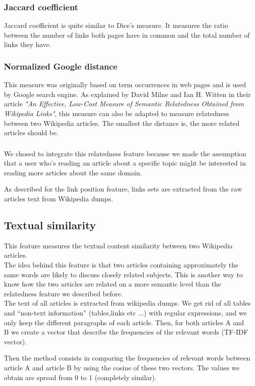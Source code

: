 \subsubsection*{Jaccard coefficient}
Jaccard coefficient is quite similar to Dice's measure. It measures the ratio between the number of links both pages have in common and the total number of links they have.\

\subsubsection*{Normalized Google distance}
This measure was originally based on term occurrences in web pages and is used by Google search engine. As explained by David Milne and Ian H. Witten in their article \textit{"An Effective, Low-Cost Measure of Semantic Relatedness Obtained from Wikipedia Links"}, this measure can also be adapted to measure relatedness between two Wikipedia articles. The smallest the distance is, the more related articles should be.\

\subsubsection*{}
We chosed to integrate this relatedness feature because we made the assumption that a user who’s reading an article about a specific topic might be interested in reading more articles about the same domain. 

As described for the link position feature, links sets are extracted from the raw articles text from Wikipedia dumps.

\subsection{Textual similarity}

This feature measures the textual content similarity between two Wikipedia articles.  \\

The idea behind this feature is that two articles containing approximately the same words are likely to discuss closely related subjects. This is another way to know how the two articles are related on a more semantic level than the relatedness feature we described before.\\

The text of all articles is extracted from wikipedia dumps. We get rid of all tables and “non-text information” (tables,links etc ...) with regular expressions, and we only keep the different paragraphs of each article. Then, for both articles A and B we create a vector that describe the frequencies of the relevant words (TF-IDF vector).\

Then the method consists in comparing the frequencies of relevant words between article A and article B by using the cosine of these two vectors. The values we obtain are spread from 0 to 1 (completely similar).
